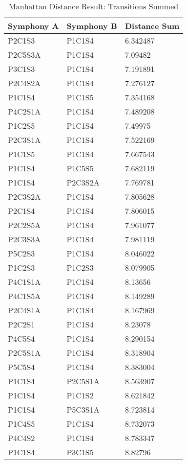 \begin{longtable}{|l|l|l|}
\caption{Manhattan Distance Result: Transitions Summed}
\label{my-label}\\
\hline
Symphony A & Symphony B & Distance Sum \\ \hline
\endfirsthead
%
\endhead
%
P2C1S3 & P1C1S4 & 6.342487 \\ \hline
P2C5S3A & P1C1S4 & 7.09482 \\ \hline
P3C1S3 & P1C1S4 & 7.191891 \\ \hline
P2C4S2A & P1C1S4 & 7.276127 \\ \hline
P1C1S4 & P1C1S5 & 7.354168 \\ \hline
P4C2S1A & P1C1S4 & 7.489208 \\ \hline
P1C2S5 & P1C1S4 & 7.49975 \\ \hline
P2C3S1A & P1C1S4 & 7.522169 \\ \hline
P1C1S5 & P1C1S4 & 7.667543 \\ \hline
P1C1S4 & P1C5S5 & 7.682119 \\ \hline
P1C1S4 & P2C3S2A & 7.769781 \\ \hline
P2C3S2A & P1C1S4 & 7.805628 \\ \hline
P2C1S4 & P1C1S4 & 7.806015 \\ \hline
P2C2S5A & P1C1S4 & 7.961077 \\ \hline
P2C3S3A & P1C1S4 & 7.981119 \\ \hline
P5C2S3 & P1C1S4 & 8.046022 \\ \hline
P1C2S3 & P1C2S3 & 8.079905 \\ \hline
P4C1S1A & P1C1S4 & 8.13656 \\ \hline
P4C1S5A & P1C1S4 & 8.149289 \\ \hline
P2C4S1A & P1C1S4 & 8.167969 \\ \hline
P2C2S1 & P1C1S4 & 8.23078 \\ \hline
P4C5S4 & P1C1S4 & 8.290154 \\ \hline
P2C5S1A & P1C1S4 & 8.318904 \\ \hline
P5C5S4 & P1C1S4 & 8.383004 \\ \hline
P1C1S4 & P2C5S1A & 8.563907 \\ \hline
P1C1S4 & P1C1S2 & 8.621842 \\ \hline
P1C1S4 & P5C3S1A & 8.723814 \\ \hline
P1C4S5 & P1C1S4 & 8.732073 \\ \hline
P4C4S2 & P1C1S4 & 8.783347 \\ \hline
P1C1S4 & P3C1S5 & 8.82796 \\ \hline
\end{longtable}

